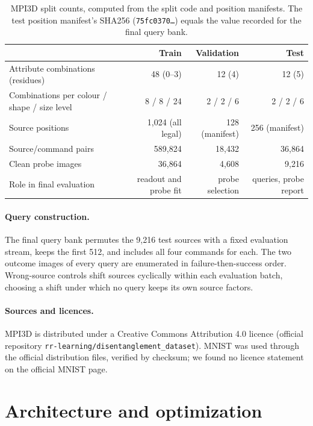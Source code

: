 \begin{table}[htbp]
\caption{MPI3D split counts, computed from the split code and position manifests. The test position manifest's SHA256 (\texttt{75fc0370\ldots}) equals the value recorded for the final query bank.}
\label{tab:mpsplit}
\centering
\small
\begin{tabular}{@{}lrrr@{}}
\toprule
 & Train & Validation & Test \\
\midrule
Attribute combinations (residues) & 48 (0--3) & 12 (4) & 12 (5) \\
Combinations per colour / shape / size level & 8 / 8 / 24 & 2 / 2 / 6 & 2 / 2 / 6 \\
Source positions & 1{,}024 (all legal) & 128 (manifest) & 256 (manifest) \\
Source/command pairs & 589{,}824 & 18{,}432 & 36{,}864 \\
Clean probe images & 36{,}864 & 4{,}608 & 9{,}216 \\
Role in final evaluation & readout and probe fit & probe selection & queries, probe report \\
\bottomrule
\end{tabular}
\end{table}

\paragraph{Query construction.} The final query bank permutes the 9{,}216 test sources with a fixed evaluation stream, keeps the first 512, and includes all four commands for each. The two outcome images of every query are enumerated in failure-then-success order. Wrong-source controls shift sources cyclically within each evaluation batch, choosing a shift under which no query keeps its own source factors.

\paragraph{Sources and licences.} MPI3D is distributed under a Creative Commons Attribution 4.0 licence (official repository \texttt{rr-learning/disentanglement\_dataset}). MNIST was used through the official distribution files, verified by checksum; we found no licence statement on the official MNIST page.

\FloatBarrier
\section{Architecture and optimization}
\label{app:arch}

